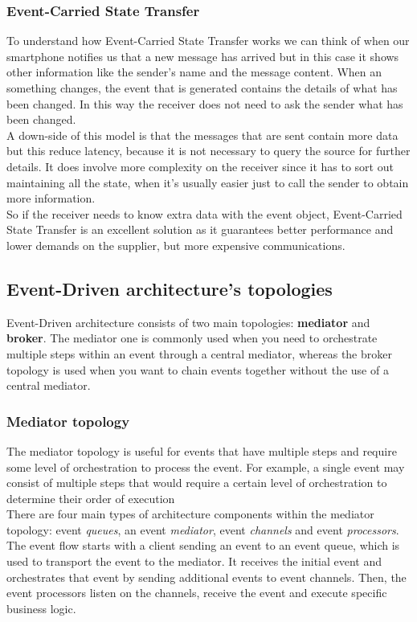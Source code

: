 \documentclass[11pt]{article} %
\begin{document}
\subsubsection{Event-Carried State Transfer}
To understand how Event-Carried State Transfer works we can think of when our smartphone notifies us that a new message has arrived but in this case it shows other information like the sender's name and the message content. When an something changes, the event that is generated contains the details of what has been changed. In this way the receiver does not need to ask the sender what has been changed.\\
A down-side of this model is that the messages that are sent contain more data but this reduce latency, because it is not necessary to query the source for further details. It does involve more complexity on the receiver since it has to sort out maintaining all the state, when it's usually easier just to call the sender to obtain more information.\\
So if the receiver needs to know extra data with the event object, Event-Carried State Transfer is an excellent solution as it guarantees better performance and lower demands on the supplier, but more expensive communications.


\subsection{Event-Driven architecture's topologies}
Event-Driven architecture consists of two main topologies: \textbf{mediator} and \textbf{broker}. The mediator one is commonly used when you need to orchestrate multiple steps within an event through a central mediator, whereas the broker topology is used when you want to chain events together without the use of a central mediator.

\subsubsection{Mediator topology}
The mediator topology is useful for events that have multiple steps and require some level of orchestration to process the event. For example, a single event may consist of multiple steps that would require a certain level of orchestration to determine their order of execution \\
There are four main types of architecture components within the mediator topology: event \emph{queues}, an event \emph{mediator}, event \emph{channels} and event \emph{processors}. \\
The event flow starts with a client sending an event to an event queue, which is used to transport the event to the mediator. It receives the initial event and orchestrates that event by sending additional events to event channels. Then, the event processors listen on the channels, receive the event and execute specific business logic.
\end{document}
